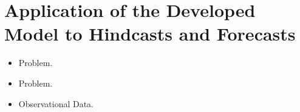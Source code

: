 
\section{Application of the Developed Model to Hindcasts and Forecasts}
\label{sec:6_Application}


\begin{itemize}
\item Problem.
\item Problem.
\item Observational Data.
\end{itemize}
